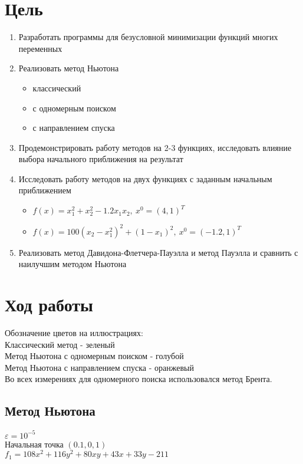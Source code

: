\section{Цель}
\begin{enumerate}
	\item Разработать программы для безусловной минимизации функций
	многих переменных
	\item Реализовать метод Ньютона
		\begin{itemize}
			\item классический
			\item с одномерным поиском
			\item с направлением спуска
		\end{itemize}
	\item Продемонстрировать работу методов на 2-3 функциях, исследовать влияние выбора начального приближения на результат
	\item Исследовать работу методов на двух функциях с заданным начальным приближением
		\begin{itemize}
			\item \(f(x) = x_1^2 + x_2^2 - 1.2x_1x_2,\ x^0 = (4, 1)^T\)
			\item \(f(x) = 100(x_2 - x_1^2)^2 + (1 - x_1)^2,\ x^0 = (-1.2, 1)^T\)	
		\end{itemize}
	\item Реализовать метод Давидона-Флетчера-Пауэлла и метод Пауэлла и сравнить с наилучшим методом Ньютона
\end{enumerate}

\section{Ход работы}

Обозначение цветов на иллюстрациях:\\
Классический метод - зеленый\\
Метод Ньютона с одномерным поиском - голубой\\
Метод Ньютона с направлением спуска - оранжевый\\
Во всех измерениях для одномерного поиска использовался метод Брента.

\subsection{Метод Ньютона}

\(\varepsilon = 10^{-5}\)\\
Начальная точка $(0.1, 0,1)$\\
\(f_1 = 108x^2 + 116y^2 + 80xy + 43x + 33y - 211\)\\

